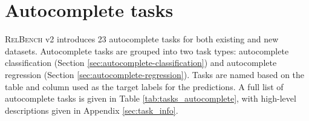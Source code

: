 \documentclass{article} %
\newcommand{\relbench}{\textsc{RelBench}\xspace}
\newcommand{\mimic}{\texttt{rel-mimic}\xspace}
\begin{document}





\section{Autocomplete tasks} \label{sec:autocomplete-tasks}


\relbench v2 introduces 23 autocomplete tasks for both existing and new datasets.  Autocomplete tasks are grouped into two task types: autocomplete classification (Section \ref{sec:autocomplete-classification}) and autocomplete regression (Section \ref{sec:autocomplete-regression}). Tasks are named based on the table and column used as the target labels for the predictions. A full list of autocomplete tasks is given in Table \ref{tab:tasks_autocomplete}, with high-level descriptions given in Appendix \ref{sec:task_info}.
\end{document}
